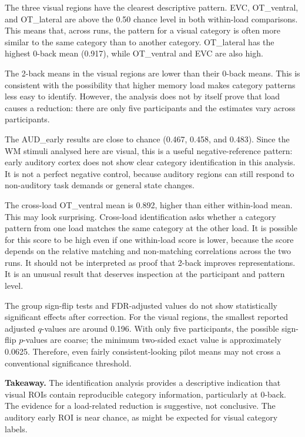 \documentclass[11pt,a4paper]{article}
\begin{document}
The three visual regions have the clearest descriptive pattern. EVC, OT\_ventral, and OT\_lateral are above the 0.50 chance level in both within-load comparisons. This means that, across runs, the pattern for a visual category is often more similar to the same category than to another category. OT\_lateral has the highest 0-back mean (0.917), while OT\_ventral and EVC are also high.

The 2-back means in the visual regions are lower than their 0-back means. This is consistent with the possibility that higher memory load makes category patterns less easy to identify. However, the analysis does not by itself prove that load causes a reduction: there are only five participants and the estimates vary across participants.

The AUD\_early results are close to chance (0.467, 0.458, and 0.483). Since the WM stimuli analysed here are visual, this is a useful negative-reference pattern: early auditory cortex does not show clear category identification in this analysis. It is not a perfect negative control, because auditory regions can still respond to non-auditory task demands or general state changes.

The cross-load OT\_ventral mean is 0.892, higher than either within-load mean. This may look surprising. Cross-load identification asks whether a category pattern from one load matches the same category at the other load. It is possible for this score to be high even if one within-load score is lower, because the score depends on the relative matching and non-matching correlations across the two runs. It should not be interpreted as proof that 2-back improves representations. It is an unusual result that deserves inspection at the participant and pattern level.

The group sign-flip tests and FDR-adjusted values do not show statistically significant effects after correction. For the visual regions, the smallest reported adjusted \(q\)-values are around 0.196. With only five participants, the possible sign-flip \(p\)-values are coarse; the minimum two-sided exact value is approximately 0.0625. Therefore, even fairly consistent-looking pilot means may not cross a conventional significance threshold.

\textbf{Takeaway.} The identification analysis provides a descriptive indication that visual ROIs contain reproducible category information, particularly at 0-back. The evidence for a load-related reduction is suggestive, not conclusive. The auditory early ROI is near chance, as might be expected for visual category labels.
\end{document}
